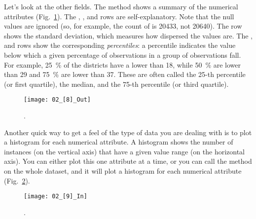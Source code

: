 Let’s look at the other fields. The  method shows a summary of the numerical attributes (Fig.~\ref{02_[8]_Out}). The , ,  and  rows are self-explanatory. Note that the null values are ignored (so, for example, the count of  is \num{20433}, not \num{20640}). The  row shows the standard deviation, which measures how
dispersed the values are. The ,  and  rows show the corresponding \emph{percentiles}: a percentile indicates the value below which a given percentage of observations in a group of observations fall. For example, \SI{25}{\percent} of the districts have a  lower than 18, while \SI{50}{\percent} are lower than 29 and \SI{75}{\percent} are lower than 37. These are often called the 25-th percentile (or first quartile), the median, and the 75-th percentile (or third quartile).
\begin{figure}[h!t]
\centering
\vspace{1pt}\texttt{[image: 02\_[8]\_Out]}
\caption{.}\label{02_[8]_Out}
\end{figure}

Another quick way to get a feel of the type of data you are dealing with is to plot a histogram for each numerical attribute. A histogram shows the number of instances (on the vertical axis) that have a given value range (on the horizontal axis). You can either plot this one attribute at a time, or you can call the  method on the whole dataset, and it will plot a histogram for each numerical attribute (Fig.~\ref{02_[9]_In}).
\begin{figure}[h!t]
\centering
\texttt{[image: 02\_[9]\_In]}
\caption{.}\label{02_[9]_In}
\end{figure}

